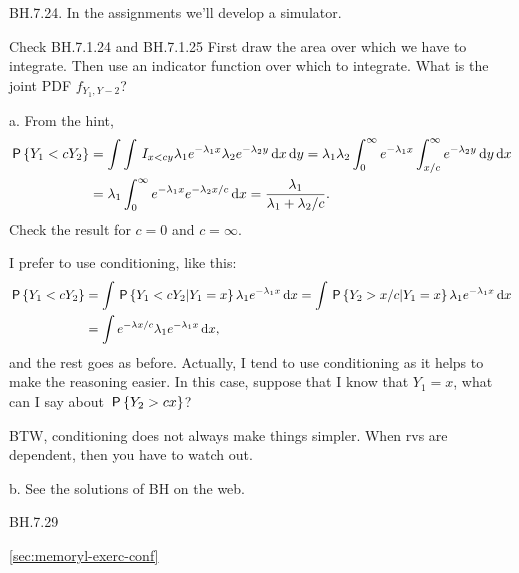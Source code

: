 \begin{exercise}
BH.7.24.
In the assignments we'll develop a simulator.

\begin{hint}
Check BH.7.1.24 and BH.7.1.25
First draw the area over which we have to integrate. Then use an indicator function over which to integrate. What is the joint PDF  $f_{Y_1, Y-2}$?
\end{hint}
\begin{solution}
a. From the hint,
\begin{align*}
\P{Y_1<c Y_2}
  &= \int \int \1{x<c y}\lambda_1 e^{-\lambda_1 x} \lambda_2e^{-\lambda_2 y}\d x \d y
  = \lambda_1\lambda_2\int_0^{\infty} e^{-\lambda_{1}x}\int_{x/c}^{\infty} e^{-\lambda_{2} y}\d y \d x\\
  & = \lambda_1\int_0^{\infty} e^{-\lambda_{1}x} e^{-\lambda_{2} x/c} \d x
  = \frac{\lambda_1}{\lambda_1+\lambda_2/c}.
\end{align*}
Check the result for $c=0$ and $c=\infty$.

I prefer to use conditioning, like this:
\begin{align*}
\P{Y_1<c Y_2}
  &= \int \P{Y_1<cY_2| Y_1=x}\lambda_1 e^{-\lambda_1 x} \d x
  = \int \P{Y_2>x/c| Y_1=x}\lambda_1 e^{-\lambda_1 x} \d x\\
&= \int e^{-\lambda x/c} \lambda_1 e^{-\lambda_1 x} \d x,
\end{align*}
and the rest goes as before. Actually, I tend to use conditioning as it helps to make the reasoning easier. In this case, suppose that I know that $Y_1=x$, what can I say about $\P{Y_2 > c x}$?

BTW, conditioning does not always make things simpler. When rvs are dependent, then you have to watch out.

b. See the solutions of BH on the web.
\end{solution}
\end{exercise}


\begin{exercise}
BH.7.29
\begin{hint}
\cref{sec:memoryl-exerc-conf}
\end{hint}
\begin{solution}
\end{solution}
\end{exercise}


